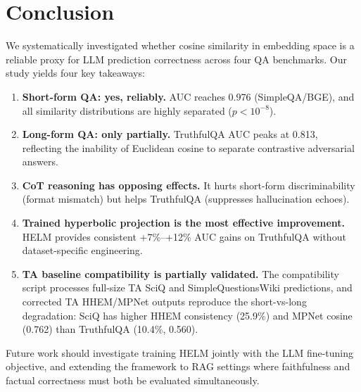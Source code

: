\documentclass[11pt,a4paper]{article}
\begin{document}
\section{Conclusion}
\label{sec:conclusion}

We systematically investigated whether cosine similarity in embedding space is a
reliable proxy for LLM prediction correctness across four QA benchmarks.
Our study yields four key takeaways:

\begin{enumerate}[nosep]
  \item \textbf{Short-form QA: yes, reliably.}  AUC reaches 0.976 (SimpleQA/BGE),
        and all similarity distributions are highly separated ($p < 10^{-8}$).
  \item \textbf{Long-form QA: only partially.}  TruthfulQA AUC peaks at 0.813,
        reflecting the inability of Euclidean cosine to separate contrastive
        adversarial answers.
  \item \textbf{CoT reasoning has opposing effects.}  It hurts short-form
        discriminability (format mismatch) but helps TruthfulQA (suppresses
        hallucination echoes).
  \item \textbf{Trained hyperbolic projection is the most effective improvement.}
        HELM provides consistent +7\%--+12\% AUC gains on TruthfulQA without
        dataset-specific engineering.
  \item \textbf{TA baseline compatibility is partially validated.}  The
        compatibility script processes full-size TA SciQ and SimpleQuestionsWiki
        predictions, and corrected TA HHEM/MPNet outputs reproduce the
        short-vs-long degradation: SciQ has higher HHEM consistency (25.9\%)
        and MPNet cosine (0.762) than TruthfulQA (10.4\%, 0.560).
\end{enumerate}

Future work should investigate training HELM jointly with the LLM fine-tuning
objective, and extending the framework to RAG settings where faithfulness and
factual correctness must both be evaluated simultaneously.



\end{document}

